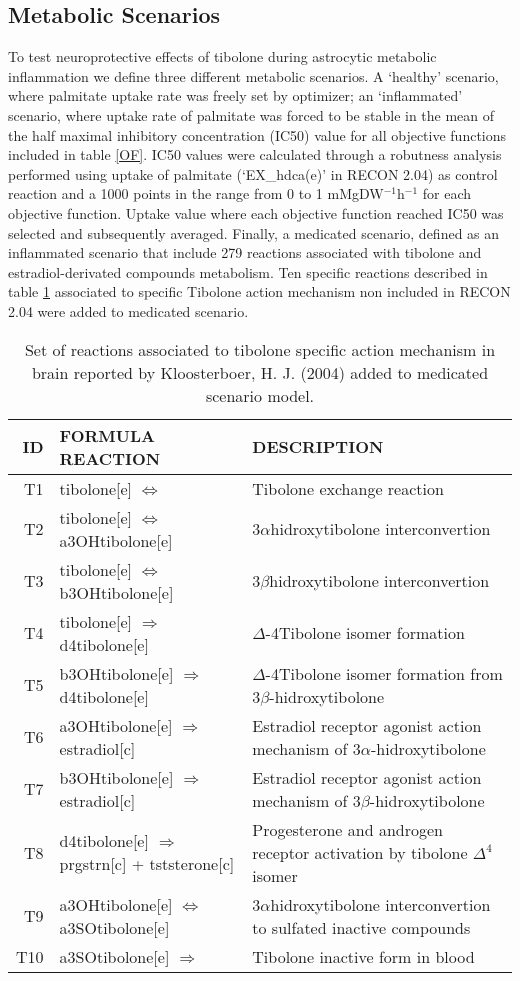 \subsection*{Metabolic Scenarios}
To test neuroprotective effects of tibolone during astrocytic metabolic inflammation we define three different metabolic scenarios. A `healthy' scenario, where palmitate uptake rate was freely set by optimizer; an `inflammated' scenario, where uptake rate of palmitate was forced to be stable in the mean of the half maximal inhibitory concentration (IC50) value for all objective functions included in table \ref{OF}. IC50 values were calculated through a robutness analysis performed using uptake of palmitate (`EX\_hdca(e)' in RECON 2.04) as control reaction and a 1000 points in the range from 0 to 1 mMgDW$^{-1}$h$^{-1}$ for each objective function. Uptake value where each objective function reached IC50 was selected and subsequently averaged. Finally, a medicated scenario, defined as an inflammated scenario that include 279 reactions associated with tibolone and estradiol-derivated compounds metabolism. Ten specific reactions described in table \ref{Tibolone} associated to specific Tibolone action mechanism non included in RECON 2.04 were added to medicated scenario.
\begin{table}[h]
\caption{Set of reactions associated to tibolone specific action mechanism in brain reported by Kloosterboer, H. J. (2004) added to medicated scenario model.}
\label{Tibolone}
\begin{center}
\begin{tabular}{rlm{7cm}}
\hline
ID & FORMULA REACTION & DESCRIPTION \\
\hline
\hline
T1 & tibolone[e] $\Leftrightarrow$ & Tibolone exchange reaction\\
T2 & tibolone[e] $\Leftrightarrow$ a3OHtibolone[e] & 3$\alpha$hidroxytibolone interconvertion\\
T3 & tibolone[e] $\Leftrightarrow$ b3OHtibolone[e] & 3$\beta$hidroxytibolone interconvertion \\
T4 & tibolone[e] $\Rightarrow$ d4tibolone[e] & $\Delta$-4Tibolone isomer formation \\
T5 & b3OHtibolone[e] $\Rightarrow$ d4tibolone[e] &  $\Delta$-4Tibolone isomer formation from 3$\beta$-hidroxytibolone \\
T6 & a3OHtibolone[e] $\Rightarrow$ estradiol[c] & Estradiol receptor agonist action mechanism of 3$\alpha$-hidroxytibolone\\
T7 & b3OHtibolone[e] $\Rightarrow$ estradiol[c] & Estradiol receptor agonist action mechanism of 3$\beta$-hidroxytibolone\\
T8 & d4tibolone[e] $\Rightarrow$ prgstrn[c] + tststerone[c] & Progesterone and androgen receptor activation by tibolone $\Delta^4$ isomer\\
T9 & a3OHtibolone[e] $\Leftrightarrow$ a3SOtibolone[e] & 3$\alpha$hidroxytibolone interconvertion to sulfated inactive compounds \\
T10 & a3SOtibolone[e] $\Rightarrow$ & Tibolone inactive form in blood \\ 
\hline
\end{tabular}
\end{center}
\end{table} 
